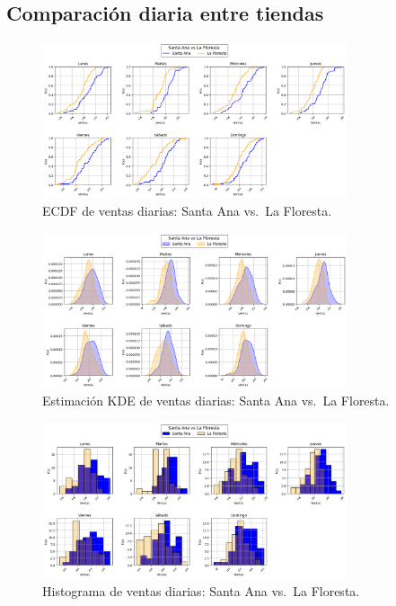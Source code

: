 \documentclass[12pt,a4paper]{article}
\begin{document}
\subsection{Comparación diaria entre tiendas}
\begin{figure}[H]
  \centering
  \includegraphics[width=0.8\textwidth]{graphs/SantaAna_vs_LaFloresta_Diario_ecdf_comparison.png}
  \caption{ECDF de ventas diarias: Santa Ana vs.\ La Floresta.}
\end{figure}
\begin{figure}[H]
  \centering
  \includegraphics[width=0.8\textwidth]{graphs/SantaAna_vs_LaFloresta_Diario_kde_comparison.png}
  \caption{Estimación KDE de ventas diarias: Santa Ana vs.\ La Floresta.}
\end{figure}
\begin{figure}[H]
  \centering
  \includegraphics[width=0.8\textwidth]{graphs/SantaAna_vs_LaFloresta_Diario_histogram_comparison.png}
  \caption{Histograma de ventas diarias: Santa Ana vs.\ La Floresta.}
\end{figure}
\end{document}
